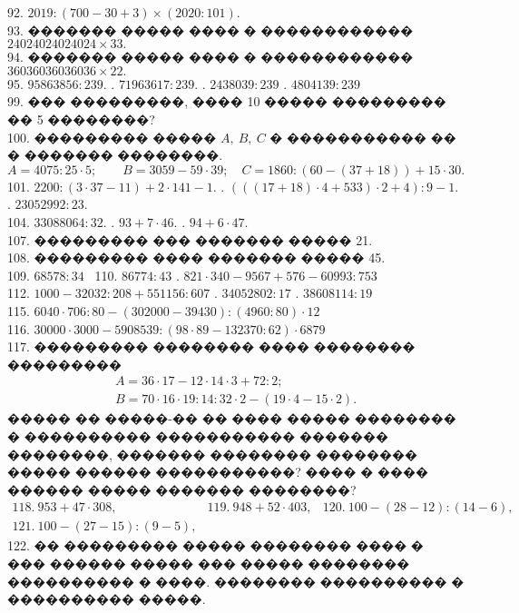 \documentclass[12pt]{article}
\begin{document}
92. $2019:(700-30+3) \times (2020:101).$\\
93. ������� ����� ���� � ������������ $24024024024024\times33.$\\
94. ������� ����� ���� � ������������ $36 036 036 036 036 \times 22.$\\
95. $95863856:239.$ . $71963617:239.$ . $2438039 : 239$ . $4804139 : 239$\\
99. ��� ���������, ���� 10 ����� ��������� �� 5 ��������?\\
100. ��������� ����� $A,\ B,\ C$ � ����������� �� � ������� ��������.\\
$A=4075:25\cdot5; \qquad B=3059-59\cdot39; \quad C=1860:(60-(37+18))+15\cdot30.$\\
101. $2200:(3\cdot37-11)+2\cdot141-1.$ . $(((17+18)\cdot4+533)\cdot2+4):9-1.$ . $23052992:23.$ \\ 104. $33088064:32.$
. $93+7\cdot46.$ . $94+6\cdot47.$\\
107. ��������� ��� ������� ����� 21.\\
108. ��������� ���� ������� ����� 45.\\
109. $68578:34$ \ 110. $86774:43$ . $821 \cdot 340 - 9567 + 576 - 60993 : 753$ \\ 112. $1000 - 32032 : 208 + 551156 : 607$ . $34052802 : 17$ . $38608114 : 19$ \\ 115. $6040 \cdot 706 : 80 - (302000 - 39430) : (4960 : 80) \cdot 12$\\
116. $30000\cdot 3000 - 5908539 : (98 \cdot 89 - 132370 : 62) \cdot 6879$\\
117. ��������� �������� ���� �������� ���������
$$\begin{array}{l} A=36\cdot17-12\cdot14\cdot3+72:2;\\
B=70\cdot16\cdot19:14:32\cdot2-(19\cdot4-15\cdot2).\end{array}$$
����� �� �����-�� �� ���� ����� �������� � ���������� ����������� ������� ��������, ������� �������� �������� ����� ������ �����������? ���� � ���� ������ ����� ������� ��������?\\
$\begin{array}{lll}
118.\ 953 + 47 \cdot 308,& 119.\ 948 + 52 \cdot 403,& 120.\ 100 - (28 - 12) : (14 - 6),\\
121.\ 100 - (27 - 15) : (9 - 5),
\end{array}$\\
122. �� ��������� ����� �������� ���� � ��� ������ ����� ��� ����� �������� ���������� � ����. �������� ���������� � ���������� �����.\\
\end{document}
